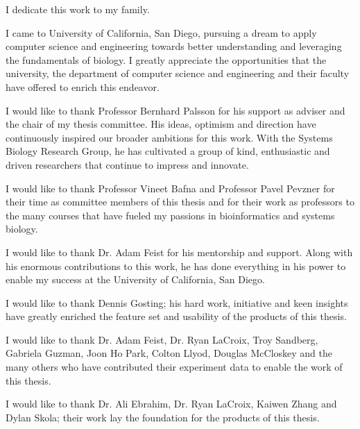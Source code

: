 %
\begin{frontmatter}

%
%
\makefrontmatter

\begin{dedication} 
I dedicate this work to my family.
\end{dedication}


%
\tableofcontents
\listoffigures  %
\listoftables   %

\begin{acknowledgements}
I came to University of California, San Diego, pursuing a dream to apply computer science and engineering towards better understanding and leveraging the fundamentals of biology. I greatly appreciate the opportunities that the university, the department of computer science and engineering and their faculty have offered to enrich this endeavor.

I would like to thank Professor Bernhard Palsson for his support as adviser and the chair of my thesis committee. His ideas, optimism and direction have continuously inspired our broader ambitions for this work. With the Systems Biology Research Group, he has cultivated a group of kind, enthusiastic and driven researchers that continue to impress and innovate.

I would like to thank Professor Vineet Bafna and Professor Pavel Pevzner for their time as committee members of this thesis and for their work as professors to the many courses that have fueled my passions in bioinformatics and systems biology.

I would like to thank Dr. Adam Feist for his mentorship and support. Along with his enormous contributions to this work, he has done everything in his power to enable my success at the University of California, San Diego.

I would like to thank Dennis Gosting; his hard work, initiative and keen insights have greatly enriched the feature set and usability of the products of this thesis.

I would like to thank Dr. Adam Feist, Dr. Ryan LaCroix, Troy Sandberg, Gabriela Guzman, Joon Ho Park, Colton Llyod, Douglas McCloskey and the many others who have contributed their experiment data to enable the work of this thesis.

I would like to thank Dr. Ali Ebrahim, Dr. Ryan LaCroix, Kaiwen Zhang and Dylan Skola; their work lay the foundation for the products of this thesis.


\end{acknowledgements}
\end{frontmatter}
